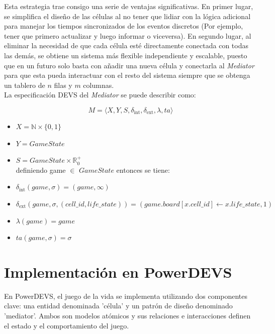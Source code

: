 \documentclass[]{article}
\newcommand{\dint}{\delta_{\text{int}}}
\newcommand{\dext}{\delta_{\text{ext}}}
\newcommand{\R}{\mathbb{R}}
\newcommand{\N}{\mathbb{N}}
\begin{document}
Esta estrategia trae consigo una serie de ventajas significativas. En primer lugar, se simplifica el diseño de las células al no tener que lidiar con la lógica adicional para manejar los tiempos sincronizados de los eventos discretos (Por ejemplo, tener que primero actualizar y luego informar o viceversa). En segundo lugar, al eliminar la necesidad de que cada célula esté directamente conectada con todas las demás, se obtiene un sistema más flexible independiente y escalable, puesto que en un futuro solo basta con añadir una nueva célula y conectarla al \textit{Mediator} para que esta pueda interactuar con el resto del sistema siempre que se obtenga un tablero de $n$ filas y $m$ columnas.\\

La especificación DEVS del \textit{Mediator} se puede describir como:

\[ M = \langle X, Y, S, \dint, \dext, \lambda, ta \rangle \]


\begin{itemize}
  \item $X = \N \times \{0,1\}$

  \item $Y = GameState$

  \item $S = GameState \times  \R_0^+$\\

        definiendo game $\in$ $GameState$ entonces se tiene:
  \item $\dint(game,\sigma) = (game,\infty)$

  \item $\dext(game, \sigma, (cell\_id, life\_state)) =
          (game.board[x.cell\_id] \leftarrow x.life\_state, 1)
        $


  \item $\lambda(game) = game $
  \item $ta(game,\sigma) = \sigma$
\end{itemize}





\section{Implementación en PowerDEVS}
En PowerDEVS, el juego de la vida se implementa utilizando dos componentes clave: una entidad denominada 'célula' y un patrón de diseño denominado 'mediator'. Ambos son modelos atómicos y sus relaciones e interacciones definen el estado y el comportamiento del juego.
\end{document}
